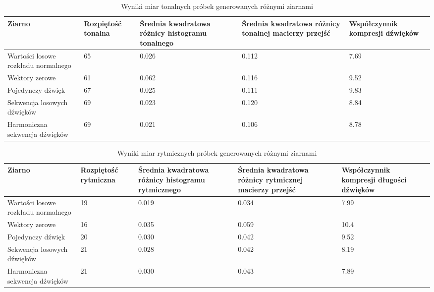 {{        \begin{table}
            \begin{center}
                \begin{tabular}{ |p{2.5cm}|p{2.5cm}|p{2.5cm}|p{2.5cm}|p{2.5cm}| }
                \hline
                Ziarno & Rozpiętość tonalna & Średnia kwadratowa różnicy histogramu tonalnego & Średnia kwadratowa różnicy tonalnej macierzy przejść & Współczynnik kompresji dźwięków \\ 
                \hline
                \hline
                Wartości losowe rozkładu normalnego & 65 & 0.026 & 0.112 & 7.69 \\  
                \hline
                Wektory zerowe & 61 & 0.062 & 0.116 & 9.52 \\
                \hline
                Pojedynczy dźwięk & 67 & 0.025 & 0.111 & 9.83 \\
                \hline
                Sekwencja losowych dźwięków & 69 & 0.023 & 0.120 & 8.84 \\
                \hline
                Harmoniczna sekwencja dźwięków & 69 & 0.021 & 0.106  & 8.78 \\
                \hline
                \end{tabular}
            \end{center}
            \caption{Wyniki miar tonalnych próbek generowanych różnymi ziarnami} \label{tonal_measuremnts_table}
        \end{table}
        
        \begin{table}
            \begin{center}
                \begin{tabular}{ |p{2.5cm}|p{2.5cm}|p{2.5cm}|p{2.5cm}|p{2.5cm}| }
                \hline
                Ziarno & Rozpiętość rytmiczna & Średnia kwadratowa różnicy histogramu rytmicznego & Średnia kwadratowa różnicy rytmicznej macierzy przejść & Współczynnik kompresji długości dźwięków \\ 
                \hline
                \hline
                Wartości losowe rozkładu normalnego & 19 & 0.019 & 0.034 & 7.99 \\  
                \hline
                Wektory zerowe & 16 & 0.035 & 0.059 & 10.4 \\
                \hline
                Pojedynczy dźwięk & 20 & 0.030 & 0.042 & 9.52 \\
                \hline
                Sekwencja losowych dźwięków & 21 & 0.028 & 0.042 & 8.19 \\
                \hline
                Harmoniczna sekwencja dźwięków & 21 & 0.030 & 0.043 & 7.89 \\
                \hline
                \end{tabular}
            \end{center}
            \caption{Wyniki miar rytmicznych próbek generowanych różnymi ziarnami} \label{rythm_measuremnts_table}
        \end{table}

}}
